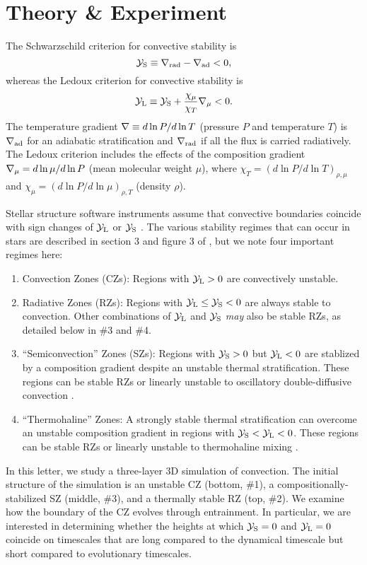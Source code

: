 \section{Theory \& Experiment}
\label{sec:theory}
The Schwarzschild criterion for convective stability is
\begin{equation}
    \yS \equiv \gradrad - \gradad < 0,
    \label{eqn:yS}
\end{equation}
whereas the Ledoux criterion for convective stability is
\begin{equation}
    \yL \equiv \yS +  \frac{\chi_\mu}{\chi_T}\gradmu < 0.
    \label{eqn:yL}
\end{equation}
The temperature gradient $\nabla \equiv d \ln P / d \ln T$ (pressure $P$ and temperature $T$) is $\nabla_{\rm{ad}}$ for an adiabatic stratification and $\nabla_{\rm{rad}}$ if all the flux is carried radiatively.
The Ledoux criterion includes the effects of the composition gradient $\nabla_{\mu} = d\ln\mu/d\ln P$ (mean molecular weight $\mu$), where $\chi_T = (d\ln P / d\ln T)_{\rho,\mu}$ and $\chi_\mu = (d\ln P / d\ln\mu)_{\rho,T}$ (density $\rho$).

Stellar structure software instruments assume that convective boundaries coincide with sign changes of $\mathcal{Y}_{\rm{L}}$ or $\mathcal{Y}_{\rm{S}}$ \citep[][sec.~2]{mesa4}.
The various stability regimes that can occur in stars are described in section 3 and figure 3 of \citet{salaris_cassisi_2017}, but we note four important regimes here:
\begin{enumerate}
    \item Convection Zones (CZs): Regions with ${\mathcal{Y}_{\rm{L}} > 0}$ are convectively unstable.
    \item Radiative Zones (RZs): Regions with $\mathcal{Y}_{\rm{L}} \leq \mathcal{Y}_{\rm{S}} < 0$ are always stable to convection.
        Other combinations of $\mathcal{Y}_{\rm{L}}$ and $\mathcal{Y}_{\rm{S}}$ \emph{may} also be stable RZs, as detailed below in \#3 and \#4.
    \item ``Semiconvection'' Zones (SZs): Regions with ${\mathcal{Y}_{\rm{S}} > 0}$ but $\mathcal{Y}_{\rm{L}} < 0$ are stablized by a composition gradient despite an unstable thermal stratification.
        These regions can be stable RZs or linearly unstable to oscillatory double-diffusive convection \citep[ODDC, see][chapters 2 and 4]{garaud_2018}.
    \item ``Thermohaline'' Zones: A strongly stable thermal stratification can overcome an unstable composition gradient in regions with $\mathcal{Y}_{\rm{S}} < \mathcal{Y}_{\rm{L}} < 0$.
        These regions can be stable RZs or linearly unstable to thermohaline mixing \citep[see][chapters 2 and 3]{garaud_2018}.
\end{enumerate}
In this letter, we study a three-layer 3D simulation of convection.
The initial structure of the simulation is an unstable CZ (bottom, \#1), a compositionally-stabilized SZ (middle, \#3), and a thermally stable RZ (top, \#2).
We examine how the boundary of the CZ evolves through entrainment.
In particular, we are interested in determining whether the heights at which $\mathcal{Y}_{\rm{S}} = 0$ and $\mathcal{Y}_{\rm{L}} = 0$ coincide on timescales that are long compared to the dynamical timescale but short compared to evolutionary timescales.

